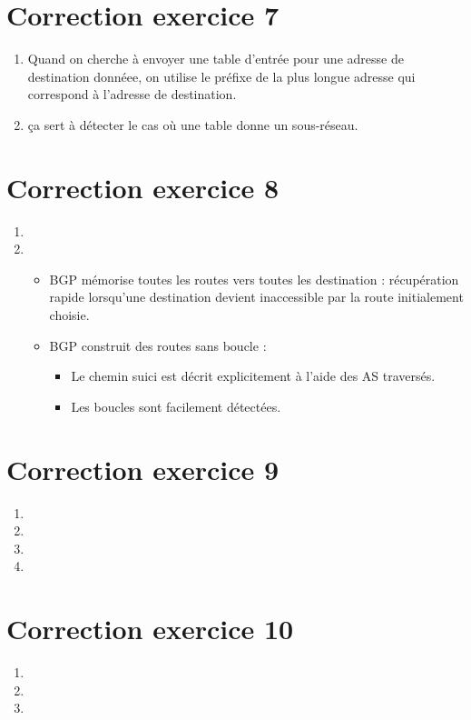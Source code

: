 \documentclass[a4paper, 11pt, titlepage]{article}
\begin{document}
\section{Correction exercice 7}
\begin{enumerate}[label=(\alph*)]
\item
Quand on cherche à envoyer une table d'entrée pour une adresse de destination donnéee, on utilise le préfixe de la plus longue adresse qui correspond à l'adresse de destination.

\item 
ça sert à détecter le cas où une table donne un sous-réseau.


\end{enumerate}

\section{Correction exercice 8}
\begin{enumerate}[label=(\alph*)]
\item 

\item
\begin{itemize}
\item BGP mémorise toutes les routes vers toutes les destination : récupération rapide lorsqu'une destination devient inaccessible par la route initialement choisie.
\item BGP construit des routes sans boucle : \begin{itemize}
\item Le chemin suici est décrit explicitement à l'aide des AS traversés.
\item Les boucles sont facilement détectées.
\end{itemize}
\end{itemize}


\end{enumerate}


\section{Correction exercice 9}
\begin{enumerate}[label=(\alph*)]
\item 

\item

\item 

\item 

\end{enumerate}

\section{Correction exercice 10}
\begin{enumerate}[label=(\alph*)]
\item

\item

\item

\end{enumerate}
\end{document}
